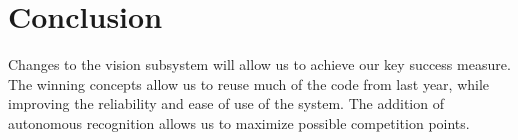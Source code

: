 \documentclass[]{auvsi_doc}
\begin{document}
\section{Conclusion}

Changes to the vision subsystem will allow us to achieve our key success measure. The winning concepts allow us to reuse much of the
code from last year, while improving the reliability and ease of use of the system. The addition of autonomous recognition allows
us to maximize possible competition points.
\end{document}
